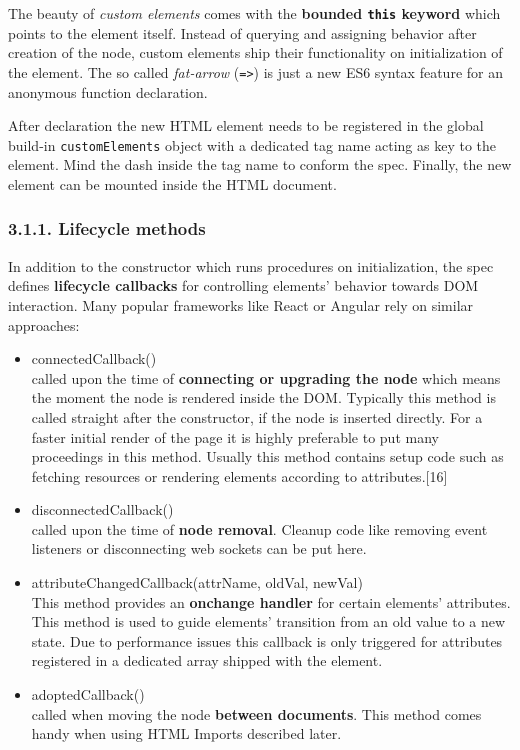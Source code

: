 \documentclass[]{article}
\providecommand{\tightlist}{%
  \setlength{\itemsep}{0pt}\setlength{\parskip}{0pt}}
\begin{document}
The beauty of \emph{custom elements} comes with the \textbf{bounded
\texttt{this} keyword} which points to the element itself. Instead of
querying and assigning behavior after creation of the node, custom
elements ship their functionality on initialization of the element. The
so called \emph{fat-arrow} (\texttt{=\textgreater{}}) is just a new ES6
syntax feature for an anonymous function declaration.

After declaration the new HTML element needs to be registered in the
global build-in \texttt{customElements} object with a dedicated tag name
acting as key to the element. Mind the dash inside the tag name to
conform the spec. Finally, the new element can be mounted inside the
HTML document.

\subsubsection{3.1.1. Lifecycle methods}\label{lifecycle-methods}

In addition to the constructor which runs procedures on initialization,
the spec defines \textbf{lifecycle callbacks} for controlling elements'
behavior towards DOM interaction. Many popular frameworks like React or
Angular rely on similar approaches:

\begin{itemize}
\tightlist
\item
  connectedCallback()\\
  called upon the time of \textbf{connecting or upgrading the node}
  which means the moment the node is rendered inside the DOM. Typically
  this method is called straight after the constructor, if the node is
  inserted directly. For a faster initial render of the page it is
  highly preferable to put many proceedings in this method. Usually this
  method contains setup code such as fetching resources or rendering
  elements according to attributes.{[}16{]}
\item
  disconnectedCallback()\\
  called upon the time of \textbf{node removal}. Cleanup code like
  removing event listeners or disconnecting web sockets can be put here.
\item
  attributeChangedCallback(attrName, oldVal, newVal)\\
  This method provides an \textbf{onchange handler} for certain
  elements' attributes. This method is used to guide elements'
  transition from an old value to a new state. Due to performance issues
  this callback is only triggered for attributes registered in a
  dedicated array shipped with the element.
\item
  adoptedCallback()\\
  called when moving the node \textbf{between documents}. This method
  comes handy when using HTML Imports described later.
\end{itemize}
\end{document}

